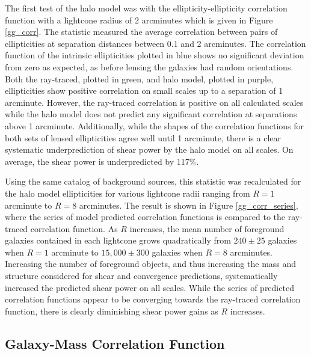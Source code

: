 \documentclass[%
 reprint,
 amsmath,amssymb,
 aps,nofootinbib
]{revtex4-1}
\begin{document}
The first test of the halo model was with the ellipticity-ellipticity correlation function with a lightcone radius of 2 arcminutes which is given in Figure \ref{gg_corr}. The statistic measured the average correlation between pairs of ellipticities at separation distances between 0.1 and 2 arcminutes. The correlation function of the intrinsic ellipticities plotted in blue shows no significant deviation from zero as expected, as before lensing the galaxies had random orientations. Both the ray-traced, plotted in green, and halo model, plotted in purple, ellipticities show positive correlation on small scales up to a separation of 1 arcminute. However, the ray-traced correlation is positive on all calculated scales while the halo model does not predict any significant correlation at separations above 1 arcminute. Additionally, while the shapes of the correlation functions for both sets of lensed ellipticities agree well until 1 arcminute, there is a clear systematic underprediction of shear power by the halo model on all scales. On average, the shear power is underpredicted by 117\%.

Using the same catalog of background sources, this statistic was recalculated for the halo model ellipticities for various lightcone radii ranging from $R=1$ arcminute to $R=8$ arcminutes. The result is shown in Figure \ref{gg_corr_series}, where the series of model predicted correlation functions is compared to the ray-traced correlation function. As $R$ increases, the mean number of foreground galaxies contained in each lightcone grows quadratically from ${240\pm25}$ galaxies when $R=1$ arcminute to ${15,000\pm300}$ galaxies when $R=8$ arcminutes. Increasing the number of foreground objects, and thus increasing the mass and structure considered for shear and convergence predictions, systematically increased the predicted shear power on all scales. While the series of predicted correlation functions appear to be converging towards the ray-traced correlation function, there is clearly diminishing shear power gains as $R$ increases.

\subsection*{Galaxy-Mass Correlation Function}
\end{document}
